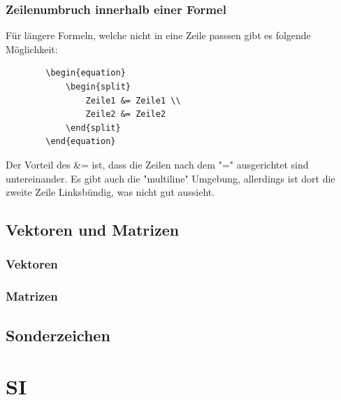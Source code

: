 \documentclass[
12pt,
a4paper,
headings=small,                    %
bibliography=totoc,                %
listof=totoc,                      %
parskip=half*,                     %
]{scrartcl}                        %
\begin{document}
	\subsubsection{Zeilenumbruch innerhalb einer Formel}
	Für längere Formeln, welche nicht in eine Zeile passsen gibt es folgende Möglichkeit:
	\begin{verbatim}
		\begin{equation} 
			\begin{split} 
				Zeile1 &= Zeile1 \\ 
				Zeile2 &= Zeile2
			\end{split} 
		\end{equation} 
	\end{verbatim}
	Der Vorteil des \&= ist, dass die Zeilen nach dem "=" ausgerichtet sind untereinander. Es gibt auch die "multiline" Umgebung, allerdings ist dort die zweite Zeile Linksbündig, was nicht gut aussieht.
	
	\subsection{Vektoren und Matrizen}
	\subsubsection{Vektoren}
	\subsubsection{Matrizen}
	
	\subsection{Sonderzeichen}
	
	
	
	\newpage
	\section{SI}
	
	
	
	
	\newpage
\end{document}
